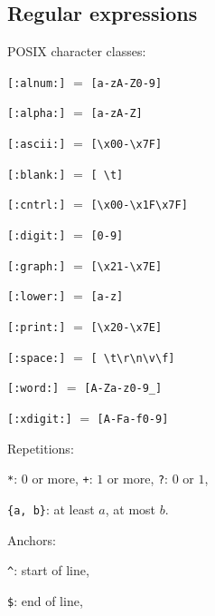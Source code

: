\subsection{Regular expressions}
\begin{compactenum}
\item POSIX character classes:
\begin{compactenum}
\item \texttt{[:alnum:]} $=$ \texttt{[a-zA-Z0-9]}
\item \texttt{[:alpha:]} $=$ \texttt{[a-zA-Z]}
\item \texttt{[:ascii:]} $=$ \texttt{[\textbackslash{}x00-\textbackslash{}x7F]}
\item \texttt{[:blank:]} $=$ \texttt{[ \textbackslash{}t]}
\item \texttt{[:cntrl:]} $=$ \texttt{[\textbackslash{}x00-\textbackslash{}x1F\textbackslash{}x7F]}
\item \texttt{[:digit:]} $=$ \texttt{[0-9]}
\item \texttt{[:graph:]} $=$ \texttt{[\textbackslash{}x21-\textbackslash{}x7E]}
\item \texttt{[:lower:]} $=$ \texttt{[a-z]}
\item \texttt{[:print:]} $=$ \texttt{[\textbackslash{}x20-\textbackslash{}x7E]}
\item \texttt{[:space:]} $=$ \texttt{[ \textbackslash{}t\textbackslash{}r\textbackslash{}n\textbackslash{}v\textbackslash{}f]}
\item \texttt{[:word:]} $=$ \texttt{[A-Za-z0-9\_]}
\item \texttt{[:xdigit:]} $=$ \texttt{[A-Fa-f0-9]}
\end{compactenum}
\item Repetitions:
\begin{compactenum}
\item \texttt{*}: $0$ or more, \texttt{+}: $1$ or more, \texttt{?}: $0$ or $1$,
\item \texttt{\{a, b\}}: at least $a$, at most $b$.
\end{compactenum}
\item Anchors:
\begin{compactenum}
\item \texttt{\textasciicircum}: start of line,
\item \texttt{\$}: end of line, 

\end{compactenum}
\end{compactenum}
